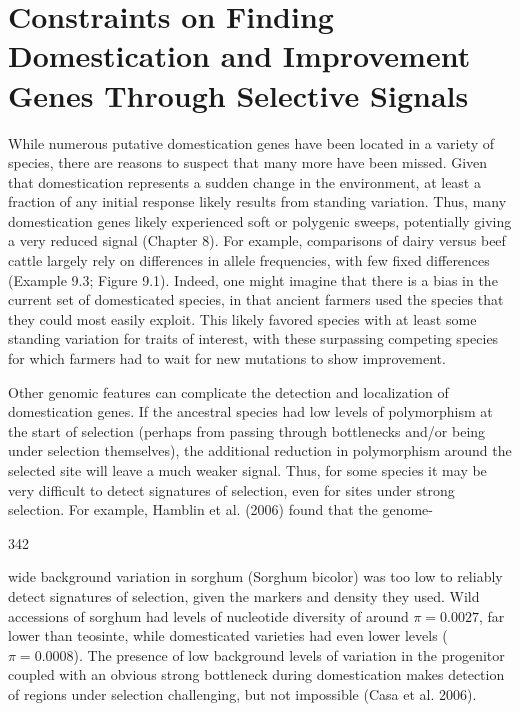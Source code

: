 \documentclass{article}
\begin{document}
\section{Constraints on Finding Domestication and Improvement Genes Through Selective Signals}
While numerous putative domestication genes have been located in a variety of species, there are reasons to suspect that many more have been missed. Given that domestication represents a sudden change in the environment, at least a fraction of any initial response likely results from standing variation. Thus, many domestication genes likely experienced soft or polygenic sweeps, potentially giving a very reduced signal (Chapter 8). For example, comparisons of dairy versus beef cattle largely rely on differences in allele frequencies, with few fixed differences (Example 9.3; Figure 9.1). Indeed, one might imagine that there is a bias in the current set of domesticated species, in that ancient farmers used the species that they could most easily exploit. This likely favored species with at least some standing variation for traits of interest, with these surpassing competing species for which farmers had to wait for new mutations to show improvement.

Other genomic features can complicate the detection and localization of domestication genes. If the ancestral species had low levels of polymorphism at the start of selection (perhaps from passing through bottlenecks and/or being under selection themselves), the additional reduction in polymorphism around the selected site will leave a much weaker signal. Thus, for some species it may be very difficult to detect signatures of selection, even for sites under strong selection. For example, Hamblin et al. (2006) found that the genome-

342

wide background variation in sorghum (Sorghum bicolor) was too low to reliably detect signatures of selection, given the markers and density they used. Wild accessions of sorghum had levels of nucleotide diversity of around  $ \pi = 0.0027 $, far lower than teosinte, while domesticated varieties had even lower levels ( $ \pi = 0.0008 $). The presence of low background levels of variation in the progenitor coupled with an obvious strong bottleneck during domestication makes detection of regions under selection challenging, but not impossible (Casa et al. 2006).
\end{document}
